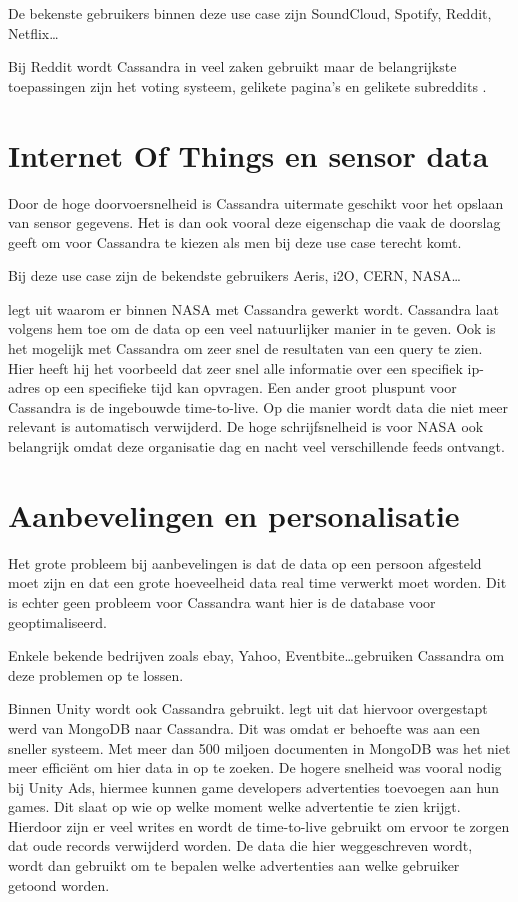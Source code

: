De bekenste gebruikers binnen deze use case zijn SoundCloud, Spotify, Reddit, Netflix\dots

Bij Reddit wordt Cassandra in veel zaken gebruikt maar de belangrijkste toepassingen zijn  het voting systeem, gelikete pagina's en gelikete subreddits \citep{Harvey2013Reddit}.

\section{Internet Of Things en sensor data}
Door de hoge doorvoersnelheid is Cassandra uitermate geschikt voor het opslaan van sensor gegevens.
Het is dan ook vooral deze eigenschap die vaak de doorslag geeft om voor Cassandra te kiezen als men bij deze use case terecht komt.

Bij deze use case zijn de bekendste gebruikers Aeris, i2O, CERN, NASA\dots

\cite{Keller2013Nasa} legt uit waarom er binnen NASA met Cassandra gewerkt wordt.
Cassandra laat volgens hem toe om de data op een veel natuurlijker manier in te geven.
Ook is het mogelijk met Cassandra om zeer snel de resultaten van een query te zien.
Hier heeft hij het voorbeeld dat zeer snel alle informatie over een specifiek ip-adres op een specifieke tijd kan opvragen.
Een ander groot pluspunt voor Cassandra is de ingebouwde time-to-live.
Op die manier wordt data die niet meer relevant is automatisch verwijderd.
De hoge schrijfsnelheid is voor NASA ook belangrijk omdat deze organisatie dag en nacht veel verschillende feeds ontvangt.

\section{Aanbevelingen en personalisatie}
Het grote probleem bij aanbevelingen is dat de data op een persoon afgesteld moet zijn en dat een grote hoeveelheid data real time verwerkt moet worden.
Dit is echter geen probleem voor Cassandra want hier is de database voor geoptimaliseerd.

Enkele bekende bedrijven zoals ebay, Yahoo, Eventbite\dots  gebruiken Cassandra om deze problemen op te lossen.

Binnen Unity wordt ook Cassandra gebruikt.
\cite{Makinen2015Cassandra} legt uit dat hiervoor overgestapt werd van MongoDB naar Cassandra.
Dit was omdat er behoefte was aan een sneller systeem.
Met meer dan 500 miljoen documenten in MongoDB was het niet meer efficiënt om hier data in op te zoeken.
De hogere snelheid was vooral nodig bij Unity Ads, hiermee kunnen game developers advertenties toevoegen aan hun games.
Dit slaat op wie op welke moment welke advertentie te zien krijgt.
Hierdoor zijn er veel writes en wordt de time-to-live gebruikt om ervoor te zorgen dat oude records verwijderd worden.
De data die hier weggeschreven wordt, wordt dan gebruikt om te bepalen welke advertenties aan welke gebruiker getoond worden.


